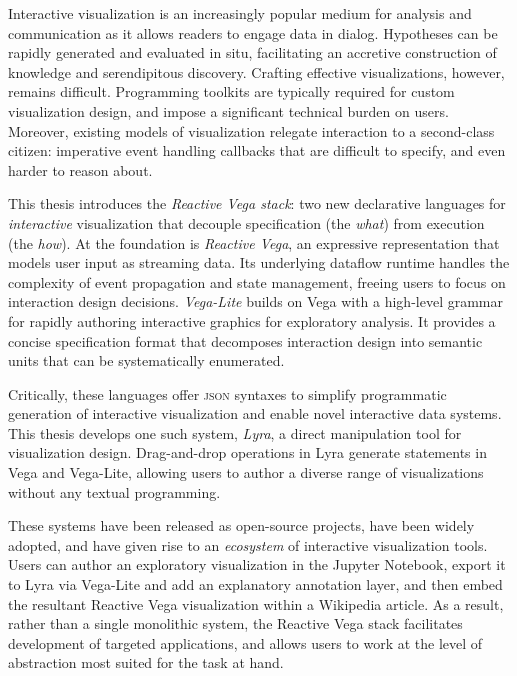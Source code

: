 

Interactive visualization is an increasingly popular medium for analysis and
communication as it allows readers to engage data in dialog. Hypotheses can be
rapidly generated and evaluated in situ, facilitating an accretive construction
of knowledge and serendipitous discovery. Crafting effective visualizations,
however, remains difficult. Programming toolkits are typically required for
custom visualization design, and impose a significant technical burden on users.
Moreover, existing models of visualization relegate interaction to a
second-class citizen: imperative event handling callbacks that are difficult to
specify, and even harder to reason about.

This thesis introduces the \emph{Reactive Vega stack}: two new declarative
languages for \emph{interactive} visualization that decouple specification (the
\emph{what}) from execution (the \emph{how}). At the foundation is
\emph{Reactive Vega}, an expressive representation that models user input as
streaming data. Its underlying dataflow runtime handles the complexity of event
propagation and state management, freeing users to focus on interaction design
decisions. \emph{Vega-Lite} builds on Vega with a high-level grammar for rapidly
authoring interactive graphics for exploratory analysis. It provides a concise
specification format that decomposes interaction design into semantic units that
can be systematically enumerated.

Critically, these languages offer \textsc{json} syntaxes to simplify
programmatic generation of interactive visualization and enable novel
interactive data systems. This thesis develops one such system, \emph{Lyra}, a
direct manipulation tool for visualization design. Drag-and-drop operations in
Lyra generate statements in Vega and Vega-Lite, allowing users to author a
diverse range of visualizations without any textual programming.

These systems have been released as open-source projects, have been widely
adopted, and have given rise to an \emph{ecosystem} of interactive visualization
tools. Users can author an exploratory visualization in the Jupyter Notebook,
export it to Lyra via Vega-Lite and add an explanatory annotation layer, and
then embed the resultant Reactive Vega visualization within a Wikipedia article.
As a result, rather than a single monolithic system, the Reactive Vega stack
facilitates development of targeted applications, and allows users to work at
the level of abstraction most suited for the task at hand.